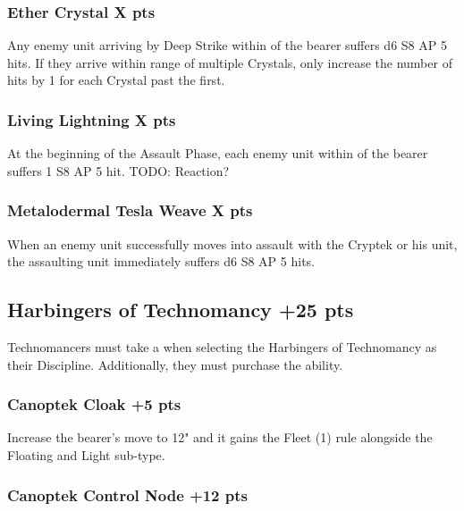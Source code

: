 \subsubsection[Ether Crystal ]{Ether Crystal  \hrulefill X pts}

Any enemy unit arriving by Deep Strike within  of the bearer suffers d6 S8 AP 5 hits. If they arrive within range of multiple Crystals, only increase the number of hits by 1 for each Crystal past the first.

\subsubsection[Living Lightning ]{Living Lightning  \hrulefill X pts}

At the beginning of the Assault Phase, each enemy unit within  of the bearer suffers 1 S8 AP 5 hit. TODO: Reaction?

\subsubsection[Metalodermal Tesla Weave ]{Metalodermal Tesla Weave  \hrulefill X pts}

When an enemy unit successfully moves into assault with the Cryptek or his unit, the assaulting unit immediately suffers d6 S8 AP 5 hits.




\subsection[Harbingers of Technomancy ]{Harbingers of Technomancy  \hrulefill +25 pts}

Technomancers must take a  when selecting the Harbingers of Technomancy as their Discipline. Additionally, they must purchase the  ability.

\subsubsection[Canoptek Cloak ]{Canoptek Cloak  \hrulefill +5 pts}

Increase the bearer's move to 12" and it gains the Fleet (1) rule alongside the Floating and Light sub-type.

\subsubsection[Canoptek Control Node ]{Canoptek Control Node  \hrulefill +12 pts}

